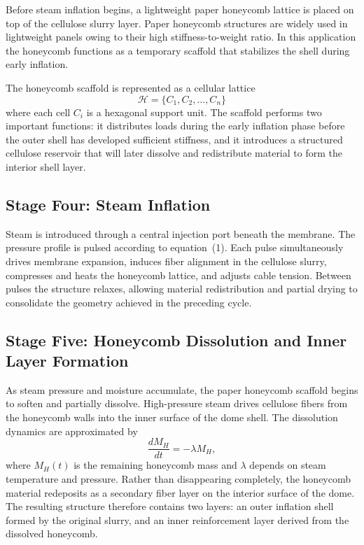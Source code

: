 \documentclass[12pt,a4paper]{article}
\begin{document}
Before steam inflation begins, a lightweight paper honeycomb lattice is
placed on top of the cellulose slurry layer. Paper honeycomb structures
are widely used in lightweight panels owing to their high stiffness-to-weight
ratio. In this application the honeycomb functions as a temporary
scaffold that stabilizes the shell during early inflation.

The honeycomb scaffold is represented as a cellular lattice
\begin{equation}
\mathcal{H} = \{C_1, C_2, \dots, C_n\}
\end{equation}
where each cell $C_i$ is a hexagonal support unit. The scaffold performs
two important functions: it distributes loads during the early inflation
phase before the outer shell has developed sufficient stiffness, and it
introduces a structured cellulose reservoir that will later dissolve and
redistribute material to form the interior shell layer.

\subsection{Stage Four: Steam Inflation}

Steam is introduced through a central injection port beneath the
membrane. The pressure profile is pulsed according to equation~(1).
Each pulse simultaneously drives membrane expansion, induces fiber
alignment in the cellulose slurry, compresses and heats the honeycomb
lattice, and adjusts cable tension. Between pulses the structure
relaxes, allowing material redistribution and partial drying to
consolidate the geometry achieved in the preceding cycle.

\subsection{Stage Five: Honeycomb Dissolution and Inner Layer Formation}

As steam pressure and moisture accumulate, the paper honeycomb scaffold
begins to soften and partially dissolve. High-pressure steam drives
cellulose fibers from the honeycomb walls into the inner surface of the
dome shell. The dissolution dynamics are approximated by
\begin{equation}
\frac{dM_H}{dt} = -\lambda M_H,
\end{equation}
where $M_H(t)$ is the remaining honeycomb mass and $\lambda$ depends on
steam temperature and pressure. Rather than disappearing completely, the
honeycomb material redeposits as a secondary fiber layer on the interior
surface of the dome. The resulting structure therefore contains two
layers: an outer inflation shell formed by the original slurry, and an
inner reinforcement layer derived from the dissolved honeycomb.
\end{document}
